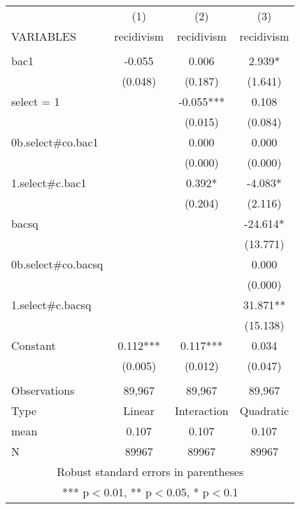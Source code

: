 \begin{tabular}{lccc} \hline
 & (1) & (2) & (3) \\
VARIABLES & recidivism & recidivism & recidivism \\ \hline
 &  &  &  \\
bac1 & -0.055 & 0.006 & 2.939* \\
 & (0.048) & (0.187) & (1.641) \\
select = 1 &  & -0.055*** & 0.108 \\
 &  & (0.015) & (0.084) \\
0b.select\#co.bac1 &  & 0.000 & 0.000 \\
 &  & (0.000) & (0.000) \\
1.select\#c.bac1 &  & 0.392* & -4.083* \\
 &  & (0.204) & (2.116) \\
bacsq &  &  & -24.614* \\
 &  &  & (13.771) \\
0b.select\#co.bacsq &  &  & 0.000 \\
 &  &  & (0.000) \\
1.select\#c.bacsq &  &  & 31.871** \\
 &  &  & (15.138) \\
Constant & 0.112*** & 0.117*** & 0.034 \\
 & (0.005) & (0.012) & (0.047) \\
 &  &  &  \\
Observations & 89,967 & 89,967 & 89,967 \\
Type & Linear & Interaction & Quadratic \\
mean & 0.107 & 0.107 & 0.107 \\
 N & 89967 & 89967 & 89967 \\ \hline
\multicolumn{4}{c}{ Robust standard errors in parentheses} \\
\multicolumn{4}{c}{ *** p$<$0.01, ** p$<$0.05, * p$<$0.1} \\
\end{tabular}

